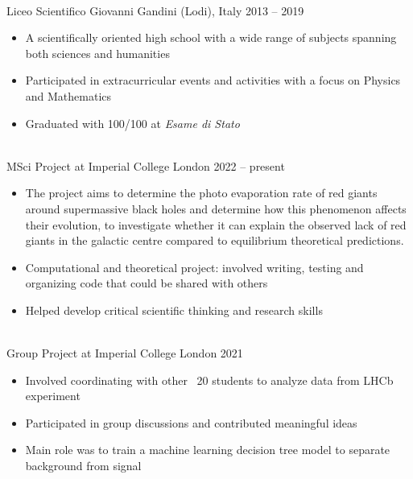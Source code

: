 \documentclass{res}[12pt] %
\begin{document}
\begin{resume}
\\ 
Liceo Scientifico Giovanni Gandini (Lodi), Italy \hfill 2013 -- 2019

\begin{itemize} \itemsep -2pt
\item A scientifically oriented high school with a wide range of subjects spanning both sciences and humanities
\item Participated in extracurricular events and activities with a focus on Physics and Mathematics
\item Graduated with 100/100 at \sl{Esame di Stato}
\end{itemize}


 


\sectionRule
\vspace{6pt} %

\\ MSci Project at Imperial College London \hfill 2022 -- present
\begin{itemize}
\item The project aims to determine the photo evaporation rate of red giants around supermassive black holes and determine how this phenomenon affects their evolution, to investigate whether it can explain the observed lack of red giants in the galactic centre compared to equilibrium theoretical predictions.
\item Computational and theoretical project: involved writing, testing and organizing code that could be shared with others
\item Helped develop critical scientific thinking and research skills
\end{itemize}

\\ Group Project at Imperial College London \hfill 2021
\begin{itemize}
\item Involved coordinating with other ~20 students to analyze data from LHCb experiment
\item Participated in group discussions and contributed meaningful ideas
\item Main role was to train a machine learning decision tree model to separate background from signal
\end{itemize}



\end{resume}
\end{document}
